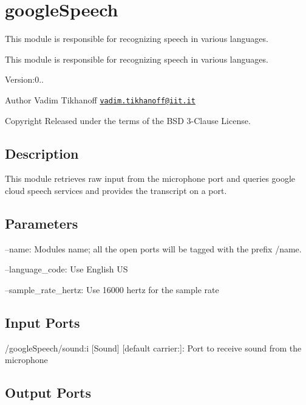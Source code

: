 \section{google\+Speech}
\label{group__googleSpeech}


This module is responsible for recognizing speech in various languages.  


This module is responsible for recognizing speech in various languages. 

Version\+:0.. \begin{DoxyAuthor}{Author}
Vadim Tikhanoff \href{mailto:vadim.tikhanoff@iit.it}{\tt vadim.\+tikhanoff@iit.\+it} ~\newline
 
\end{DoxyAuthor}
\begin{DoxyCopyright}{Copyright}
Released under the terms of the B\+SD 3-\/\+Clause License. 
\end{DoxyCopyright}
\hypertarget{group__skeletonViewer_intro_sec}{}\subsection{Description}\label{group__skeletonViewer_intro_sec}
This module retrieves raw input from the microphone port and queries google cloud speech services and provides the transcript on a port.\hypertarget{group__skeletonViewer_parameters_sec}{}\subsection{Parameters}\label{group__skeletonViewer_parameters_sec}

\begin{DoxyItemize}
\item --name\+: Module\textquotesingle{}s name; all the open ports will be tagged with the prefix /name.
\item --language\+\_\+code\+: Use English US
\item --sample\+\_\+rate\+\_\+hertz\+: Use 16000 hertz for the sample rate 
\end{DoxyItemize}\hypertarget{group__skeletonViewer_inputports_sec}{}\subsection{Input Ports}\label{group__skeletonViewer_inputports_sec}

\begin{DoxyItemize}
\item /google\+Speech/sound\+:i \mbox{[}Sound\mbox{]} \mbox{[}default carrier\+:\mbox{]}\+: Port to receive sound from the microphone
\end{DoxyItemize}\hypertarget{group__skeletonViewer_outputports_sec}{}\subsection{Output Ports}\label{group__skeletonViewer_outputports_sec}

